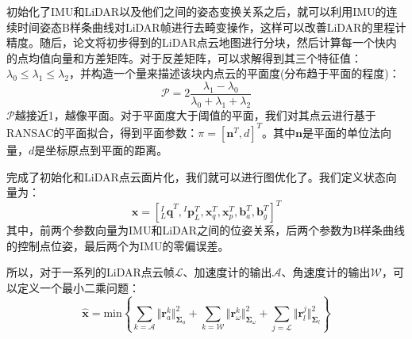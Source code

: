 \documentclass[12pt, twocolumn]{article}
\begin{document}
	初始化了IMU和LiDAR以及他们之间的姿态变换关系之后，就可以利用IMU的连续时间姿态B样条曲线对LiDAR帧进行去畸变操作，这样可以改善LiDAR的里程计精度。随后，论文将初步得到的LiDAR点云地图进行分块，然后计算每一个快内的点均值向量和方差矩阵。对于反差矩阵，可以求解得到其三个特征值：$\lambda_0\le \lambda_1\le\lambda_2$，并构造一个量来描述该块内点云的平面度(分布趋于平面的程度)：
	\begin{equation*}
		\mathcal{P}=2\frac{\lambda_1-\lambda_0}{\lambda_0+\lambda_1+\lambda_2}
	\end{equation*}
	$\mathcal{P}$越接近1，越像平面。对于平面度大于阈值的平面，我们对其点云进行基于RANSAC的平面拟合，得到平面参数：$\pi=\left[\boldsymbol{n}^T,d\right]^T$。其中$\boldsymbol{n}$是平面的单位法向量，$d$是坐标原点到平面的距离。
	
	完成了初始化和LiDAR点云面片化，我们就可以进行图优化了。我们定义状态向量为：
	\begin{equation*}
		\boldsymbol{x}=\left[{^{I}_{L}\boldsymbol{q}}^T,{^{I}\boldsymbol{p}_{L}^T},\boldsymbol{x}_q^T,\boldsymbol{x}_p^T,\boldsymbol{b}_a^T,\boldsymbol{b}_g^T\right]^T
	\end{equation*}
	其中，前两个参数向量为IMU和LiDAR之间的位姿关系，后两个参数为B样条曲线的控制点位姿，最后两个为IMU的零偏误差。
	
	所以，对于一系列的LiDAR点云帧$\mathcal{L}$、加速度计的输出$\mathcal{A}$、角速度计的输出$\mathcal{W}$，可以定义一个最小二乘问题：
	\begin{equation*}
		\hat{\boldsymbol{x}}=\mathrm{min}\left\lbrace \sum_{k=\mathcal{A}}\Vert \boldsymbol{r}_a^k\Vert^2_{\boldsymbol{\Sigma}_a}+\sum_{k=\mathcal{W}}\Vert \boldsymbol{r}_\omega^k\Vert^2_{\boldsymbol{\Sigma}_\omega}+\sum_{j=\mathcal{L}}\Vert \boldsymbol{r}_l^j\Vert^2_{\boldsymbol{\Sigma}_l} \right\rbrace 
	\end{equation*}
	
\end{document}
